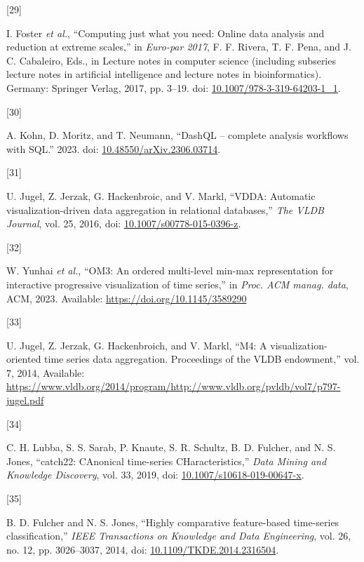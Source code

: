 \documentclass{article}
\newlength{\cslhangindent}
\newlength{\csllabelwidth}
\newlength{\cslentryspacingunit} %
\newenvironment{CSLReferences}[2] %
 {%
  \setlength{\parindent}{0pt}
  \ifodd #1
  \let\oldpar\par
  \def\par{\hangindent=\cslhangindent\oldpar}
  \fi
  \setlength{\parskip}{#2\cslentryspacingunit}
 }%
 {}
\newcommand{\CSLLeftMargin}[1]{\parbox[t]{\csllabelwidth}{#1}}
\newcommand{\CSLRightInline}[1]{\parbox[t]{\linewidth - \csllabelwidth}{#1}\break}
\begin{document}
\begin{CSLReferences}{0}{0}
\leavevmode{}%
\CSLLeftMargin{{[}29{]} }%
\CSLRightInline{I. Foster \emph{et al.}, {``Computing just what you
need: Online data analysis and reduction at extreme scales,''} in
\emph{Euro-par 2017}, F. F. Rivera, T. F. Pena, and J. C. Cabaleiro,
Eds., in Lecture notes in computer science (including subseries lecture
notes in artificial intelligence and lecture notes in bioinformatics).
Germany: Springer Verlag, 2017, pp. 3--19. doi:
\href{https://doi.org/10.1007/978-3-319-64203-1_1}{10.1007/978-3-319-64203-1\_1}.}

\leavevmode{}%
\CSLLeftMargin{{[}30{]} }%
\CSLRightInline{A. Kohn, D. Moritz, and T. Neumann, {``DashQL --
complete analysis workflows with SQL.''} 2023. doi:
\href{https://doi.org/10.48550/arXiv.2306.03714}{10.48550/arXiv.2306.03714}.}

\leavevmode{}%
\CSLLeftMargin{{[}31{]} }%
\CSLRightInline{U. Jugel, Z. Jerzak, G. Hackenbroic, and V. Markl,
{``VDDA: Automatic visualization-driven data aggregation in relational
databases,''} \emph{The VLDB Journal}, vol. 25, 2016, doi:
\href{https://doi.org/10.1007/s00778-015-0396-z}{10.1007/s00778-015-0396-z}.}

\leavevmode{}%
\CSLLeftMargin{{[}32{]} }%
\CSLRightInline{W. Yunhai \emph{et al.}, {``OM3: An ordered multi-level
min-max representation for interactive progressive visualization of time
series,''} in \emph{Proc. ACM manag. data}, ACM, 2023. Available:
\url{https://doi.org/10.1145/3589290}}

\leavevmode{}%
\CSLLeftMargin{{[}33{]} }%
\CSLRightInline{U. Jugel, Z. Jerzak, G. Hackenbroich, and V. Markl,
{``M4: A visualization-oriented time series data aggregation.
Proceedings of the VLDB endowment,''} vol. 7, 2014, Available:
\url{https://www.vldb.org/2014/program/http://www.vldb.org/pvldb/vol7/p797-jugel.pdf}}

\leavevmode{}%
\CSLLeftMargin{{[}34{]} }%
\CSLRightInline{C. H. Lubba, S. S. Sarab, P. Knaute, S. R. Schultz, B.
D. Fulcher, and N. S. Jones, {``catch22: CAnonical time-series
CHaracteristics,''} \emph{Data Mining and Knowledge Discovery}, vol. 33,
2019, doi:
\href{https://doi.org/10.1007/s10618-019-00647-x}{10.1007/s10618-019-00647-x}.}

\leavevmode{}%
\CSLLeftMargin{{[}35{]} }%
\CSLRightInline{B. D. Fulcher and N. S. Jones, {``Highly comparative
feature-based time-series classification,''} \emph{IEEE Transactions on
Knowledge and Data Engineering}, vol. 26, no. 12, pp. 3026--3037, 2014,
doi:
\href{https://doi.org/10.1109/TKDE.2014.2316504}{10.1109/TKDE.2014.2316504}.}


\end{CSLReferences}
\end{document}
